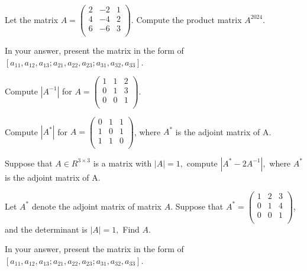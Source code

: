 \begin{problem} Let the matrix
$A=\left(
     \begin{array}{ccc}
       2 & -2 & 1 \\
       4 & -4 & 2 \\
       6 & -6 & 3 \\
     \end{array}
   \right)
$.
 Compute the product matrix $A^{2024}.$

In your answer, present the matrix in the form of $[a_{11}, a_{12}, a_{13}; a_{21}, a_{22}, a_{23}; a_{31}, a_{32}, a_{33} ]$. 
\end{problem}

\begin{problem} Compute $|A^{-1}|$ for $A=\left(
         \begin{array}{ccc}
           1 & 1 & 2 \\
           0 & 1 & 3 \\
           0 & 0 & 1 \\
         \end{array}
       \right).
$
\end{problem}

\begin{problem} Compute $|A^{*}|$ for $A=\left(
         \begin{array}{ccc}
           0 & 1 & 1 \\
           1 & 0 & 1 \\
           1 & 1 &0 \\
         \end{array}
       \right)
$, where $A^*$ is the adjoint matrix of A. 
\end{problem}

\begin{problem} Suppose that $A\in R^{3\times 3}$ is a matrix with $|A|=1,$ compute $|A^*-2A^{-1}|,$ where $A^*$ is the adjoint matrix of A.
\end{problem}

\begin{problem}  Let  $A^*$ denote the adjoint matrix of matrix $A$. 
 Suppose that
 $A^*=\left(
        \begin{array}{ccc}
          1 & 2 & 3 \\
          0 & 1 & 4 \\
          0 & 0 & 1 \\
        \end{array}
      \right)
 $, and the determinant is $|A|=1,$
Find $A.$

In your answer, present the matrix in the form of $[a_{11}, a_{12}, a_{13}; a_{21}, a_{22}, a_{23}; a_{31}, a_{32}, a_{33} ]$. 

\end{problem}

